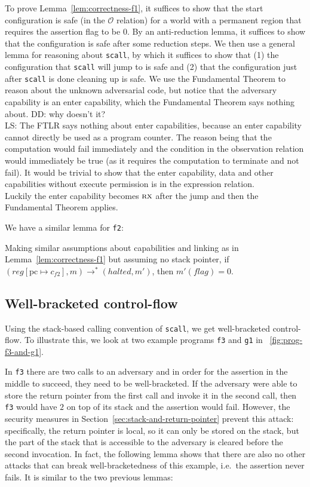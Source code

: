 \documentclass[acmsmall,review]{acmart}\settopmatter{printfolios=true}
\newcommand{\update}[2]{[#1 \mapsto #2]}
\newcommand\lau[1]{{\color{purple} \sf \footnotesize {LS: #1}}\\}
\newcommand\dominique[1]{{\color{purple} \sf \footnotesize {DD: #1}}\\}
\newcommand{\var}[1]{\mathit{#1}}
\newcommand{\pcreg}{\mathrm{pc}}
\newcommand{\reg}{\var{reg}}
\newcommand{\flag}{\var{flag}}
\newcommand{\halted}{\mathit{halted}}
\newcommand{\observations}{\mathcal{O}}
\newcommand{\plainperm}[1]{\textsc{#1}}
\newcommand{\exec}{\plainperm{rx}}
\newcommand{\step}[1][]{\rightarrow_{#1}}
\begin{document}
To prove Lemma~\ref{lem:correctness-f1}, it suffices to show that the start
configuration is safe (in the $\observations$ relation) for a world with a
permanent region that requires the assertion flag to be 0. By an anti-reduction
lemma, it suffices to show that the configuration is safe after some reduction
steps. We then use a general lemma for reasoning about
\texttt{\footnotesize{scall}}, by which it suffices to show that (1) the
configuration that \texttt{\footnotesize{scall}} will jump to is safe and (2)
that the configuration just after \texttt{\footnotesize{scall}} is done cleaning
up is safe. We use the Fundamental Theorem to reason about the unknown adversarial code, but
notice that the adversary capability is an enter capability, which the
Fundamental Theorem says nothing about.
\dominique{why doesn't it?}
\lau{The FTLR says nothing about enter capabilities, because an enter capability cannot directly be used as a program counter. The reason being that the computation would fail immediately and the condition in the observation relation would immediately be true (as it requires the computation to terminate and not fail). It would be trivial to show that the enter capability, data and other capabilities without execute permission is in the expression relation.}
Luckily the enter capability becomes
$\exec$ after the jump and then the Fundamental Theorem applies.

We have a similar lemma for \texttt{\footnotesize{f2}}:
\begin{lemma}
  \label{lem:correctness-f2}
  Making similar assumptions about capabilities and linking as in
  Lemma~\ref{lem:correctness-f1} but assuming no stack pointer,
  if $(\reg\update{\pcreg}{c_{f2}},m) \step^* (\halted,m')$, then $m'(\flag) = 0$.
\end{lemma}

\subsection{Well-bracketed control-flow} 
Using the stack-based calling convention of \texttt{\footnotesize{scall}}, we get
well-bracketed control-flow. To illustrate this, we look at
two example programs \texttt{\footnotesize{f3}} and
\texttt{\footnotesize{g1}} in \figurename~\ref{fig:prog-f3-and-g1}.

In \texttt{\footnotesize{f3}} there are two calls to an adversary and in order
for the assertion in the middle to succeed, they need to be well-bracketed. If
the adversary were able to store the return pointer from the first call and
invoke it in the second call, then \texttt{\footnotesize{f3}} would have $2$ on
top of its stack and the assertion would fail. However, the security measures in
Section~\ref{sec:stack-and-return-pointer} prevent this attack: specifically,
the return pointer is local, so it can only be stored on the stack, but the part
of the stack that is accessible to the adversary is cleared before the second
invocation. In fact, the following lemma shows that there are also no other
attacks that can break well-bracketedness of this example, i.e.\ the assertion
never fails. It is similar to the two previous lemmas:
\end{document}
